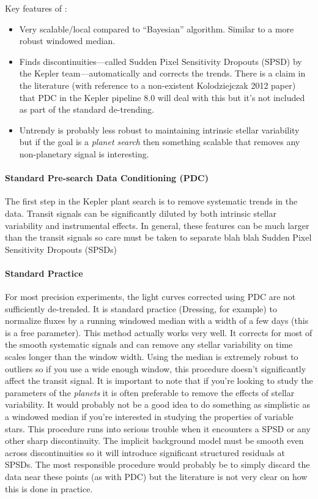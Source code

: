 \documentclass[letterpaper,12pt,preprint]{hack_aastex}
\begin{document}
Key features of :
\begin{itemize}
\item Very scalable/local compared to ``Bayesian'' algorithm. Similar to
      a more robust windowed median.
\item Finds discontinuities---called Sudden Pixel Sensitivity Dropouts (SPSD)
      by the Kepler team---automatically and corrects the trends. There is a
      claim in the literature (with reference to a non-existent
      Kolodziejczak 2012 paper) that PDC in the Kepler pipeline 8.0 will deal
      with this but it's not included as part of the standard de-trending.
\item Untrendy is probably less robust to maintaining intrinsic stellar
      variability but if the goal is a \emph{planet search} then something
      scalable that removes any non-planetary signal is interesting.
\end{itemize}

\paragraph{Standard Pre-search Data Conditioning (PDC)}
The first step in the Kepler plant search is to remove systematic trends in
the data.
Transit signals can be significantly diluted by both intrinsic stellar
variability and instrumental effects. In general, these features can be much
larger than the transit signals so care must be taken to separate
blah blah Sudden Pixel Sensitivity Dropouts (SPSDs)

\paragraph{Standard Practice}
For most precision experiments, the light curves corrected using PDC are not
sufficiently de-trended.
It is standard practice (Dressing, for example) to normalize fluxes by a
running windowed median with a width of a few days (this is a free parameter).
This method actually works very well.
It corrects for most of the smooth systematic signals and can remove any
stellar variability on time scales longer than the window width.
Using the median is extremely robust to outliers so if you use a wide enough
window, this procedure doesn't significantly affect the transit signal.
It is important to note that if you're looking to study the parameters of the
\emph{planets} it is often preferable to remove the effects of stellar
variability.
It would probably not be a good idea to do something as simplistic as a
windowed median if you're interested in studying the properties of variable
stars.
This procedure runs into serious trouble when it encounters a SPSD or any
other sharp discontinuity.
The implicit background model must be smooth even across discontinuities so it
will introduce significant structured residuals at SPSDs.
The most responsible procedure would probably be to simply discard the data
near these points (as with PDC) but the literature is not very clear on how
this is done in practice.
\end{document}

